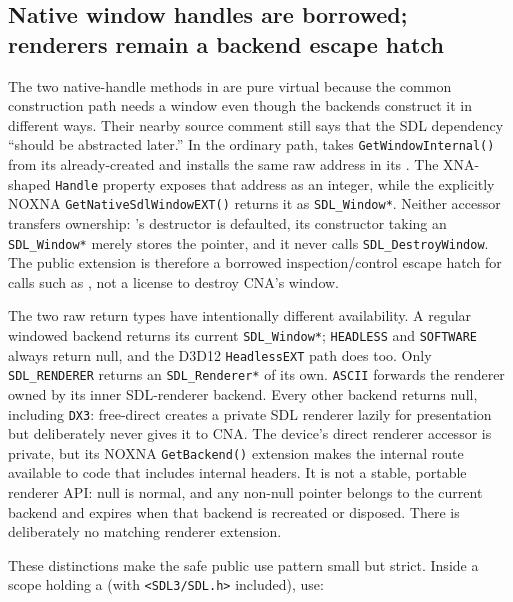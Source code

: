 \subsection{Native window handles are borrowed; renderers remain a backend escape hatch}
\label{sec:backend-native-handle-boundary}

The two native-handle methods in  are pure virtual because the
common  construction path needs a window even though the backends construct it
in different ways. Their nearby source comment still says that the SDL dependency ``should be
abstracted later.'' In the ordinary path,  takes
\texttt{GetWindowInternal()} from its already-created  and installs the
same raw address in its . The XNA-shaped \texttt{Handle} property exposes
that address as an integer, while the explicitly NOXNA
\texttt{GetNativeSdlWindowEXT()} returns it as \texttt{SDL\_Window*}. Neither accessor transfers
ownership: 's destructor is defaulted, its constructor taking an
\texttt{SDL\_Window*} merely stores the pointer, and it never calls \texttt{SDL\_DestroyWindow}.
The public extension is therefore a borrowed inspection/control escape hatch for calls such as
, not a license to destroy CNA's window.

The two raw return types have intentionally different availability. A regular windowed backend
returns its current \texttt{SDL\_Window*}; \texttt{HEADLESS} and \texttt{SOFTWARE} always return
null, and the D3D12 \texttt{HeadlessEXT} path does too. Only \texttt{SDL\_RENDERER} returns an
\texttt{SDL\_Renderer*} of its own. \texttt{ASCII} forwards the renderer owned by its inner
SDL-renderer backend. Every other backend returns null, including \texttt{DX3}: free-direct
creates a private SDL renderer lazily for presentation but deliberately never gives it to CNA.
The device's direct renderer accessor is private, but its NOXNA \texttt{GetBackend()} extension
makes the internal route available to code that includes internal headers. It is not a stable,
portable renderer API: null is normal, and any non-null pointer belongs to the current backend
and expires when that backend is recreated or disposed. There is deliberately no matching
 renderer extension.

These distinctions make the safe public use pattern small but strict. Inside a scope holding a
 (with \texttt{<SDL3/SDL.h>} included), use:

